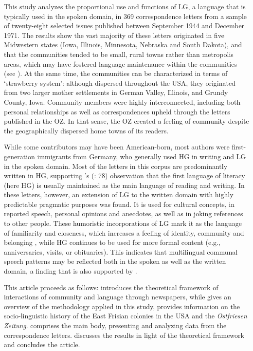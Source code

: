 \documentclass[output=paper]{langsci/langscibook}
\begin{document}
This study analyzes the proportional use and functions of LG, a language that is typically used in the spoken domain, in 369 correspondence letters from a sample of twenty-eight selected issues published between September 1944 and December 1971. The results show the vast majority of these letters originated in five Midwestern states (Iowa, Illinois, Minnesota, Nebraska and South Dakota), and that the communities tended to be small, rural towns rather than metropolis areas, which may have fostered language maintenance within the communities (see \citealt{Louden2006}). At the same time, the communities can be characterized in terms of  ‘strawberry system’: although dispersed throughout the USA, they originated from two larger mother settlements in German Valley, Illinois, and Grundy County, Iowa. Community members were highly interconnected, including both personal relationships as well as correspondences upheld through the letters published in the OZ. In that sense, the OZ created a feeling of community despite the geographically dispersed home towns of its readers.

While some contributors may have been American-born, most authors were first-generation immigrants from Germany, who generally used HG in writing and LG in the spoken domain. Most of the letters in this corpus are predominantly written in HG, supporting \citeauthor{Fishman1965}'s (\citeyear{Fishman1965}: 78) observation that the first language of literacy (here HG) is usually maintained as the main language of reading and writing. In these letters, however, an extension of LG to the written domain with highly predictable pragmatic purposes was found. It is used for cultural concepts, in reported speech, personal opinions and anecdotes, as well as in joking references to other people. These humoristic incorporations of LG mark it as the language of familiarity and closeness, which increases a feeling of identity, community and belonging \citep{Pavlenko2002}, while HG continues to be used for more formal content (e.g., anniversaries, visits, or obituaries). This indicates that multilingual communal speech patterns may be reflected both in the spoken as well as the written domain, a finding that is also supported by .%

This article proceeds as follows:  introduces the theoretical framework of interactions of community and language through newspapers, while  gives an overview of the methodology applied in this study, provides information on the socio-linguistic history of the East Frisian colonies in the USA and the \textit{Ostfriesen} \textit{Zeitung}.  comprises the main body, presenting and analyzing data from the correspondence letters.  discusses the results in light of the theoretical framework and concludes the article.
\end{document}
